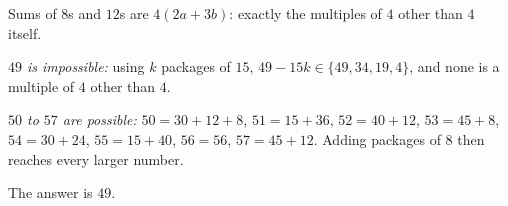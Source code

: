 Sums of $8$s and $12$s are $4(2a+3b)$: exactly the multiples of $4$ other than $4$ itself.

\emph{$49$ is impossible:} using $k$ packages of $15$, $49-15k\in\{49,34,19,4\}$, and none is a multiple of $4$ other than $4$.

\emph{$50$ to $57$ are possible:} $50=30+12+8$, $51=15+36$, $52=40+12$, $53=45+8$, $54=30+24$, $55=15+40$, $56=56$, $57=45+12$. Adding packages of $8$ then reaches every larger number.

The answer is $\boxed{49}$.
